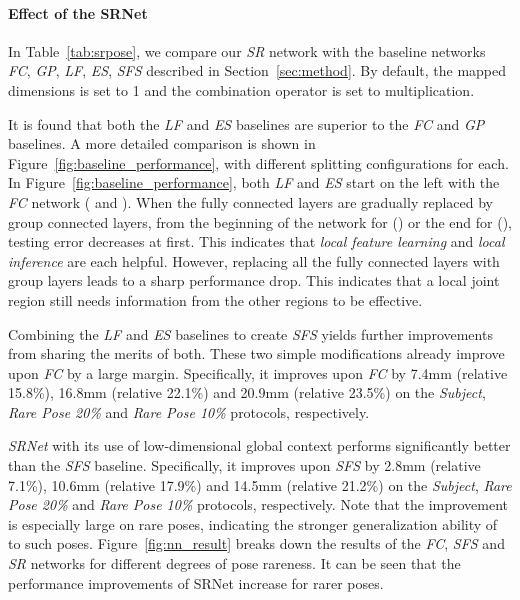 \documentclass[runningheads]{llncs}
\begin{document}
\paragraph{\textbf{Effect of the SRNet}} In Table~\ref{tab:srpose}, we compare our \emph{SR} network with the baseline networks \emph{FC}, \emph{GP}, \emph{LF}, \emph{ES}, \emph{SFS} described in Section~\ref{sec:method}. By default, the mapped dimensions  is set to 1 and the combination operator  is set to multiplication.


It is found that both the \emph{LF} and \emph{ES} baselines are superior to the \emph{FC} and \emph{GP} baselines. A more detailed comparison is shown in Figure~\ref{fig:baseline_performance}, with different splitting configurations for each. In Figure~\ref{fig:baseline_performance}, both \emph{LF} and \emph{ES} start on the left with the \emph{FC} network ( and ). When the fully connected layers are gradually replaced by group connected layers, from the beginning of the network for  () or the end for  (), testing error decreases at first. This indicates that \emph{local feature learning} and \emph{local inference} are each helpful. However, replacing all the fully connected layers with group layers leads to a sharp performance drop. This indicates that a local joint region still needs information from the other regions to be effective.

Combining the \emph{LF} and \emph{ES} baselines to create \emph{SFS} yields further improvements from sharing the merits of both. These two simple modifications already improve upon \emph{FC} by a large margin. Specifically, it improves upon \emph{FC} by 7.4mm (relative 15.8\%), 16.8mm (relative 22.1\%) and 20.9mm (relative 23.5\%) on the \emph{Subject}, \emph{Rare Pose 20\%} and \emph{Rare Pose 10\%} protocols, respectively. 


\emph{SRNet} with its use of low-dimensional global context performs significantly better than the \emph{SFS} baseline. Specifically, it improves upon \emph{SFS} by 2.8mm (relative 7.1\%), 10.6mm (relative 17.9\%) and 14.5mm (relative 21.2\%) on the \emph{Subject}, \emph{Rare Pose 20\%} and \emph{Rare Pose 10\%} protocols, respectively. Note that the improvement is especially large on rare poses, indicating the stronger generalization ability of  to such poses. Figure~\ref{fig:nn_result} breaks down the results of the \emph{FC}, \emph{SFS} and \emph{SR} networks for different degrees of pose rareness. It can be seen that the performance improvements of SRNet increase for rarer poses.
\end{document}
